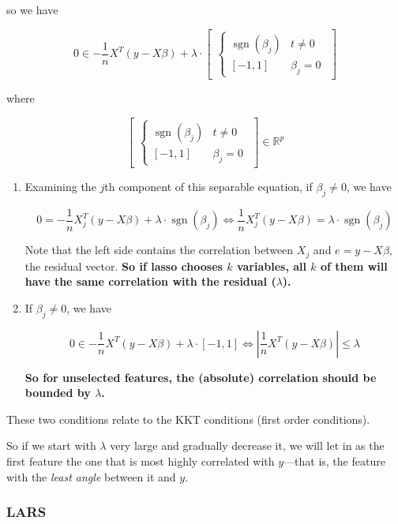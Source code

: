 so we have

\[
0 \in - \frac{1}{n} X^T(y - X \beta) + \lambda \cdot \begin{bmatrix} \begin{cases}
\operatorname{sgn}(\beta_j) & t \neq 0 \\
[-1, 1] & \beta_j = 0 
\end{cases} \end{bmatrix}
\]

where 

\[
\begin{bmatrix} \begin{cases}
\operatorname{sgn}(\beta_j) & t \neq 0 \\
[-1, 1] & \beta_j = 0 
\end{cases} \end{bmatrix} \in \mathbb{R}^p
\]

\begin{enumerate}[(1)]
\item Examining the \(j\)th component of this separable equation, if \(\beta_j \neq 0\), we have

\[
0 = -\frac{1}{n} X_j^T(y - X \beta) + \lambda \cdot
\operatorname{sgn}(\beta_j) \iff \frac{1}{n} X_j^T(y - X \beta) = \lambda \cdot
\operatorname{sgn}(\beta_j) 
\]

Note that the left side contains the correlation between \(X_j\) and \(e = y - X \beta\), the residual vector. \textbf{So if lasso chooses \(k\) variables, all \(k\) of them will have the same correlation with the residual (\(\lambda\)).}

\item If \(\beta_j \neq 0\), we have

\[
0 \in - \frac{1}{n} X^T(y - X \beta) + \lambda \cdot 
[-1, 1]  \iff \left|  \frac{1}{n} X^T(y - X \beta)  \right| \leq \lambda
\]

\textbf{So for unselected features, the (absolute) correlation should be bounded by \(\lambda\).}

\end{enumerate}

These two conditions relate to the KKT conditions (first order conditions).

So if we start with \(\lambda\) very large and gradually decrease it, we will let in as the first feature the one that is most highly correlated with \(y\)---that is, the feature with the \textit{least angle} between it and \(y\).


\subsubsection{LARS}

